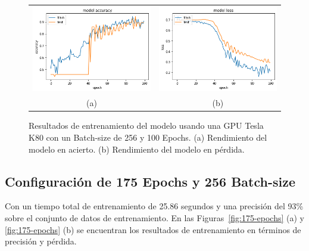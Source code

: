     \begin{figure}[H]
    \centering
    \begin{tabular}{cc}
        \includegraphics[height=0.35\textwidth]{images/chapter5/batch_256_100_epoch.png} &
        \includegraphics[height=0.35\textwidth]{images/chapter5/batch_256_100_epoch_loss.png}\\
        (a) & (b)\\
    \end{tabular}
    \caption{Resultados de entrenamiento del modelo usando una GPU Tesla K80 con un Batch-size de 256 y 100 Epochs. (a) Rendimiento del modelo en acierto. (b) Rendimiento del modelo en pérdida.}
    \label{fig:100-epochs}
\end{figure}


\subsection{Configuración de 175 Epochs y 256 Batch-size}
 Con un tiempo total de entrenamiento de 25.86 segundos y una precisión del 93\% sobre el conjunto de datos de entrenamiento.
    En las Figuras~\ref{fig:175-epochs} (a) y \ref{fig:175-epochs} (b) se encuentran los resultados de entrenamiento en términos de precisión y pérdida.



